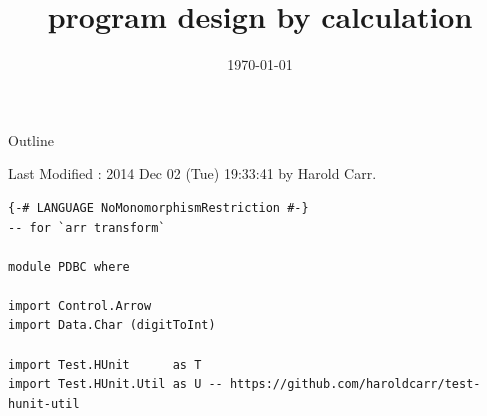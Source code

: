 \documentclass[presentation]{beamer}
\author{}
\date{\today}
\title{program design by calculation}
\begin{document}
\maketitle
\begin{frame}{Outline}
\tableofcontents
\end{frame}

Last Modified : 2014 Dec 02 (Tue) 19:33:41 by Harold Carr.

\begin{verbatim}
{-# LANGUAGE NoMonomorphismRestriction #-}
-- for `arr transform`

module PDBC where

import Control.Arrow
import Data.Char (digitToInt)

import Test.HUnit      as T
import Test.HUnit.Util as U -- https://github.com/haroldcarr/test-hunit-util
\end{verbatim}
\end{document}
